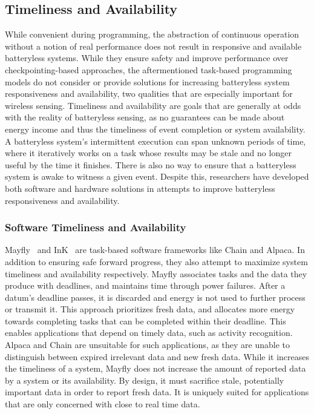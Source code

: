 \subsection{Timeliness and Availability}
While convenient during programming, the abstraction of continuous operation without a notion of real performance does not result in responsive and available batteryless systems.
While they ensure safety and improve performance over checkpointing-based approaches, the aftermentioned task-based programming models 
do not consider or provide solutions for increasing batteryless system responsiveness and availability,
two qualities that are especially important for wireless sensing. 
Timeliness and availability are goals that are generally at odds with the reality of batteryless sensing, as no guarantees can be made about energy income and thus the timeliness of event completion or system availability. 
A batteryless system's intermittent execution can span unknown periods of time, where it iteratively works on a task whose results may be stale and no longer useful by the time it finishes. There is also no way to ensure that a batteryless system is awake to witness a given event.
Despite this, researchers have developed both software and hardware solutions in attempts to improve batteryless responsiveness and availability. 

\subsubsection{Software Timeliness and Availability}
Mayfly~\cite{hesterTimely17} and InK~\cite{yildirim2018ink} are task-based software frameworks like Chain and Alpaca. In addition to ensuring safe forward progress, they also attempt to maximize system timeliness and availability respectively. Mayfly associates tasks and the data they produce with deadlines, and maintains time through power failures. 
After a datum's deadline passes, it is discarded and energy is not used to further process or transmit it. 
This approach prioritizes fresh data, and allocates more energy towards completing tasks that can be completed within their deadline. 
This enables applications that depend on timely data, such as activity recognition. Alpaca and Chain are unsuitable for such applications, as they are unable to distinguish between expired irrelevant data and new fresh data.
While it increases the timeliness of a system, Mayfly does not increase the amount of reported data by a system or its availability. By design, it must sacrifice stale, potentially important data in order to report fresh data.
It is uniquely suited for applications that are only concerned with close to real time data. 

